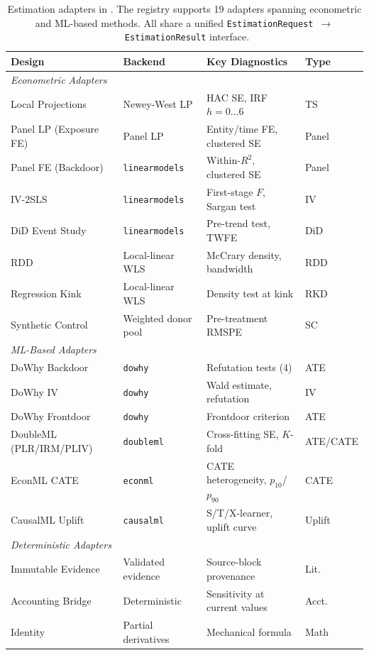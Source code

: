 \documentclass{article}
\begin{document}
\begin{table}[t]
\centering
\caption{Estimation adapters in \oc{}. The registry supports 19 adapters spanning econometric and ML-based methods. All share a unified \texttt{EstimationRequest}~$\to$~\texttt{EstimationResult} interface.}
\label{tab:adapters}
\scriptsize
\begin{tabular}{@{}llll@{}}
\toprule
\textbf{Design} & \textbf{Backend} & \textbf{Key Diagnostics} & \textbf{Type} \\
\midrule
\multicolumn{4}{l}{\textit{Econometric Adapters}} \\
Local Projections & Newey-West LP & HAC SE, IRF $h=0\ldots6$ & TS \\
Panel LP (Exposure FE) & Panel LP & Entity/time FE, clustered SE & Panel \\
Panel FE (Backdoor) & \texttt{linearmodels} & Within-$R^2$, clustered SE & Panel \\
IV-2SLS & \texttt{linearmodels} & First-stage $F$, Sargan test & IV \\
DiD Event Study & \texttt{linearmodels} & Pre-trend test, TWFE & DiD \\
RDD & Local-linear WLS & McCrary density, bandwidth & RDD \\
Regression Kink & Local-linear WLS & Density test at kink & RKD \\
Synthetic Control & Weighted donor pool & Pre-treatment RMSPE & SC \\
\midrule
\multicolumn{4}{l}{\textit{ML-Based Adapters}} \\
DoWhy Backdoor & \texttt{dowhy} & Refutation tests (4) & ATE \\
DoWhy IV & \texttt{dowhy} & Wald estimate, refutation & IV \\
DoWhy Frontdoor & \texttt{dowhy} & Frontdoor criterion & ATE \\
DoubleML (PLR/IRM/PLIV) & \texttt{doubleml} & Cross-fitting SE, $K$-fold & ATE/CATE \\
EconML CATE & \texttt{econml} & CATE heterogeneity, $p_{10}$/$p_{90}$ & CATE \\
CausalML Uplift & \texttt{causalml} & S/T/X-learner, uplift curve & Uplift \\
\midrule
\multicolumn{4}{l}{\textit{Deterministic Adapters}} \\
Immutable Evidence & Validated evidence & Source-block provenance & Lit. \\
Accounting Bridge & Deterministic & Sensitivity at current values & Acct. \\
Identity & Partial derivatives & Mechanical formula & Math \\
\bottomrule
\end{tabular}
\end{table}
\end{document}
